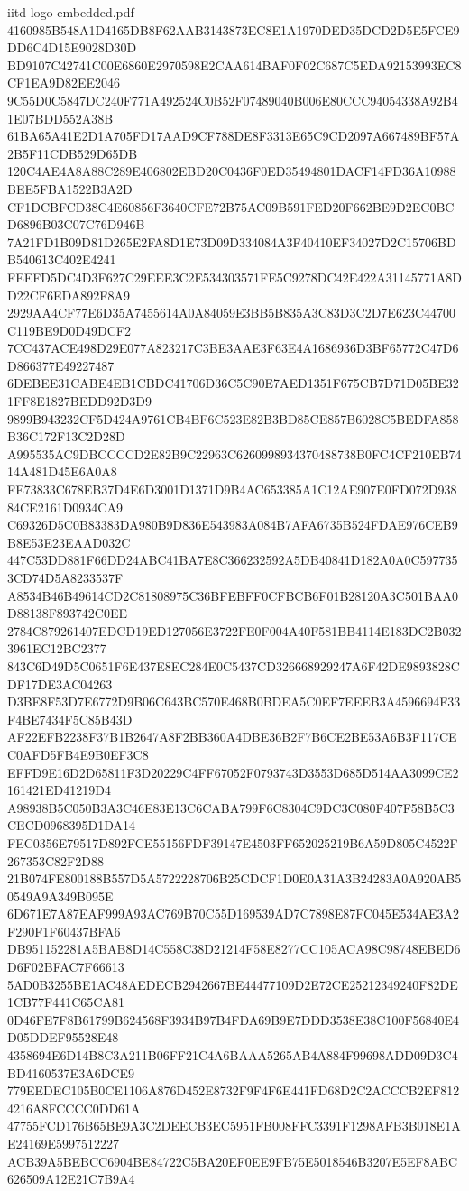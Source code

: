 \begin{filecontents*}[overwrite]{iitd-logo-embedded.pdf}
4160985B548A1D4165DB8F62AAB3143873EC8E1A1970DED35DCD2D5E5FCE9DD6C4D15E9028D30D
BD9107C42741C00E6860E2970598E2CAA614BAF0F02C687C5EDA92153993EC8CF1EA9D82EE2046
9C55D0C5847DC240F771A492524C0B52F07489040B006E80CCC94054338A92B41E07BDD552A38B
61BA65A41E2D1A705FD17AAD9CF788DE8F3313E65C9CD2097A667489BF57A2B5F11CDB529D65DB
120C4AE4A8A88C289E406802EBD20C0436F0ED35494801DACF14FD36A10988BEE5FBA1522B3A2D
CF1DCBFCD38C4E60856F3640CFE72B75AC09B591FED20F662BE9D2EC0BCD6896B03C07C76D946B
7A21FD1B09D81D265E2FA8D1E73D09D334084A3F40410EF34027D2C15706BDB540613C402E4241
FEEFD5DC4D3F627C29EEE3C2E534303571FE5C9278DC42E422A31145771A8DD22CF6EDA892F8A9
2929AA4CF77E6D35A7455614A0A84059E3BB5B835A3C83D3C2D7E623C44700C119BE9D0D49DCF2
7CC437ACE498D29E077A823217C3BE3AAE3F63E4A1686936D3BF65772C47D6D866377E49227487
6DEBEE31CABE4EB1CBDC41706D36C5C90E7AED1351F675CB7D71D05BE321FF8E1827BEDD92D3D9
9899B943232CF5D424A9761CB4BF6C523E82B3BD85CE857B6028C5BEDFA858B36C172F13C2D28D
A995535AC9DBCCCCD2E82B9C22963C6260998934370488738B0FC4CF210EB7414A481D45E6A0A8
FE73833C678EB37D4E6D3001D1371D9B4AC653385A1C12AE907E0FD072D93884CE2161D0934CA9
C69326D5C0B83383DA980B9D836E543983A084B7AFA6735B524FDAE976CEB9B8E53E23EAAD032C
447C53DD881F66DD24ABC41BA7E8C366232592A5DB40841D182A0A0C5977353CD74D5A8233537F
A8534B46B49614CD2C81808975C36BFEBFF0CFBCB6F01B28120A3C501BAA0D88138F893742C0EE
2784C879261407EDCD19ED127056E3722FE0F004A40F581BB4114E183DC2B0323961EC12BC2377
843C6D49D5C0651F6E437E8EC284E0C5437CD326668929247A6F42DE9893828CDF17DE3AC04263
D3BE8F53D7E6772D9B06C643BC570E468B0BDEA5C0EF7EEEB3A4596694F33F4BE7434F5C85B43D
AF22EFB2238F37B1B2647A8F2BB360A4DBE36B2F7B6CE2BE53A6B3F117CEC0AFD5FB4E9B0EF3C8
EFFD9E16D2D65811F3D20229C4FF67052F0793743D3553D685D514AA3099CE2161421ED41219D4
A98938B5C050B3A3C46E83E13C6CABA799F6C8304C9DC3C080F407F58B5C3CECD0968395D1DA14
FEC0356E79517D892FCE55156FDF39147E4503FF652025219B6A59D805C4522F267353C82F2D88
21B074FE800188B557D5A5722228706B25CDCF1D0E0A31A3B24283A0A920AB50549A9A349B095E
6D671E7A87EAF999A93AC769B70C55D169539AD7C7898E87FC045E534AE3A2F290F1F60437BFA6
DB951152281A5BAB8D14C558C38D21214F58E8277CC105ACA98C98748EBED6D6F02BFAC7F66613
5AD0B3255BE1AC48AEDECB2942667BE44477109D2E72CE25212349240F82DE1CB77F441C65CA81
0D46FE7F8B61799B624568F3934B97B4FDA69B9E7DDD3538E38C100F56840E4D05DDEF95528E48
4358694E6D14B8C3A211B06FF21C4A6BAAA5265AB4A884F99698ADD09D3C4BD4160537E3A6DCE9
779EEDEC105B0CE1106A876D452E8732F9F4F6E441FD68D2C2ACCCB2EF8124216A8FCCCC0DD61A
47755FCD176B65BE9A3C2DEECB3EC5951FB008FFC3391F1298AFB3B018E1AE24169E5997512227
ACB39A5BEBCC6904BE84722C5BA20EF0EE9FB75E5018546B3207E5EF8ABC626509A12E21C7B9A4

\end{filecontents*}
